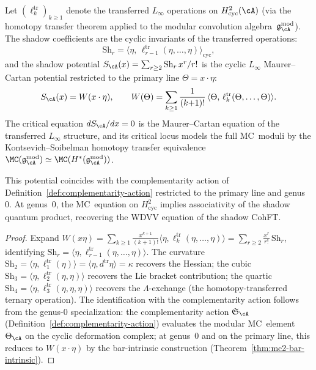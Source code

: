 \begin{theorem}
\label{thm:nms-shadow-mc-potential}%
%
%
Let $(\ell_k^{\mathrm{tr}})_{k \geq 1}$ denote the transferred
$L_\infty$ operations on $H^2_{\mathrm{cyc}}(\cA)$
(via the homotopy transfer theorem applied to the modular
convolution algebra~$\mathfrak{g}^{\mathrm{mod}}_{\cA}$).
The shadow coefficients are the cyclic invariants of the
transferred operations:
\begin{equation}\label{eq:nms-shadow-cyclic-invariant}
\mathrm{Sh}_r
= \langle \eta,\, \ell_{r-1}^{\mathrm{tr}}
 (\eta, \ldots, \eta) \rangle_{\mathrm{cyc}},
\end{equation}
and the shadow potential
$S_{\cA}(x) = \sum_{r \geq 2} \mathrm{Sh}_r\, x^r / r!$
is the cyclic $L_\infty$ Maurer--Cartan potential restricted
to the primary line $\Theta = x \cdot \eta$:
\begin{equation}\label{eq:nms-shadow-mc-potential}
S_{\cA}(x) = W(x \cdot \eta),
\qquad
W(\Theta) = \sum_{k \geq 1} \frac{1}{(k{+}1)!}\,
\langle \Theta,\, \ell_k^{\mathrm{tr}}(\Theta, \ldots, \Theta) \rangle.
\end{equation}
The critical equation $dS_{\cA}/dx = 0$ is the Maurer--Cartan
equation of the transferred $L_\infty$ structure, and its
critical locus models the full MC~moduli by the
Kontsevich--Soibelman homotopy transfer equivalence
$\MC(\mathfrak{g}^{\mathrm{mod}}_{\cA}) \simeq
\MC(H^*(\mathfrak{g}^{\mathrm{mod}}_{\cA}))$.

This potential coincides with the complementarity action
of Definition~\textup{\ref{def:complementarity-action}}
restricted to the primary line and genus~$0$.
At genus~$0$, the MC~equation on $H^2_{\mathrm{cyc}}$ implies
associativity of the shadow quantum product, recovering the
WDVV equation of the shadow CohFT\@.
\end{theorem}

\begin{proof}
Expand $W(x\eta) = \sum_{k \geq 1} \frac{x^{k+1}}{(k{+}1)!}
\langle \eta, \ell_k^{\mathrm{tr}}(\eta, \ldots, \eta) \rangle
= \sum_{r \geq 2} \frac{x^r}{r!}\, \mathrm{Sh}_r$,
identifying $\mathrm{Sh}_r
= \langle \eta, \ell_{r-1}^{\mathrm{tr}}(\eta, \ldots, \eta) \rangle$.
The curvature $\mathrm{Sh}_2 = \langle \eta, \ell_1^{\mathrm{tr}}(\eta)
\rangle = \langle \eta, d^{\mathrm{tr}}\eta \rangle = \kappa$
recovers the Hessian; the cubic
$\mathrm{Sh}_3 = \langle \eta, \ell_2^{\mathrm{tr}}(\eta, \eta) \rangle$
recovers the Lie bracket contribution; the quartic
$\mathrm{Sh}_4 = \langle \eta, \ell_3^{\mathrm{tr}}(\eta, \eta, \eta) \rangle$
recovers the $\Lambda$-exchange (the homotopy-transferred
ternary operation). The identification with the complementarity
action follows from the genus-$0$ specialization: the
complementarity action $\mathfrak{S}_{\cA}$
(Definition~\ref{def:complementarity-action}) evaluates the
modular MC~element $\Theta_{\cA}$ on the cyclic deformation
complex; at genus~$0$ and on the primary line, this reduces to
$W(x \cdot \eta)$ by the bar-intrinsic construction
(Theorem~\ref{thm:mc2-bar-intrinsic}).
\end{proof}

